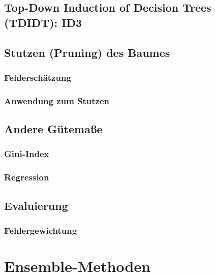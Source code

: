 	\section{Top-Down Induction of Decision Trees (TDIDT): ID3} %

	\section{Stutzen (Pruning) des Baumes} %

		\subsection{Fehlerschätzung} %

		\subsection{Anwendung zum Stutzen} %

	\section{Andere Gütemaße} %

		\subsection{Gini-Index} %

		\subsection{Regression} %

	\section{Evaluierung} %

		\subsection{Fehlergewichtung} %

\chapter{Ensemble-Methoden} %


